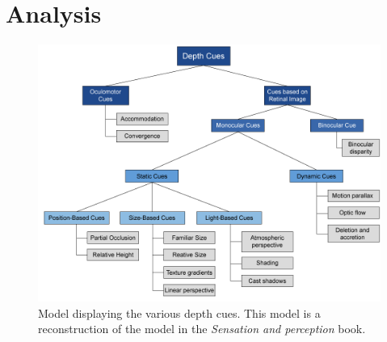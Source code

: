 \section{Analysis}
\begin{figure}[H]
	\centering
	\includegraphics[width=1\linewidth]{figure/Analysis/depthCues.png}
	\caption{Model displaying the various depth cues. This model is a reconstruction of the model in the \textit{Sensation and perception} book\citep[p.~195]{sensationPerception}.}
	\label{fig:circumplexModel}
\end{figure}